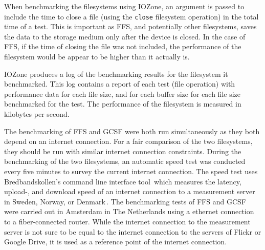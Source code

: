 When benchmarking the filesystems using IOZone, an argument is passed to include the time to close a file (using the \texttt{close} filesystem operation) in the total time of a test. This is important as FFS, and potentially other filesystems, saves the data to the storage medium only after the device is closed. In the case of FFS, if the time of closing the file was not included, the performance of the filesystem would be appear to be higher than it actually is.

IOZone produces a log of the benchmarking results for the filesystem it benchmarked. This log contains a report of each test (file operation) with performance data for each file size, and for each buffer size for each file size benchmarked for the test. The performance of the filesystem is measured in kilobytes per second.

The benchmarking of FFS and GCSF were both run simultaneously as they both depend on an internet connection. For a fair comparison of the two filesystems, they should be run with similar internet connection constraints. During the benchmarking of the two filesystems, an automatic speed test was conducted every five minutes to survey the current internet connection. The speed test uses Bredbandskollen's command line interface tool\,\cite{internetstiftelsenBredbandskollenCLIBredbandskollen} which measures the latency, upload-, and download speed of an internet connection to a measurement server in Sweden, Norway, or Denmark\,\cite{internetstiftelsenMerOmBredbandskollen}. The benchmarking tests of FFS and GCSF were carried out in Amsterdam in The Netherlands using a ethernet connection to a fiber-connected router. While the internet connection to the measurement server is not sure to be equal to the internet connection to the servers of Flickr or Google Drive, it is used as a reference point of the internet connection.